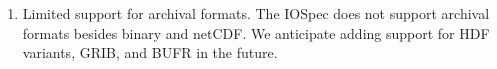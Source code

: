 

\begin{enumerate}

\item {Limited support for archival formats.}  The IOSpec does 
not support archival formats besides binary and netCDF.  We 
anticipate adding support for HDF variants, GRIB, and BUFR in 
the future.

\end{enumerate}



